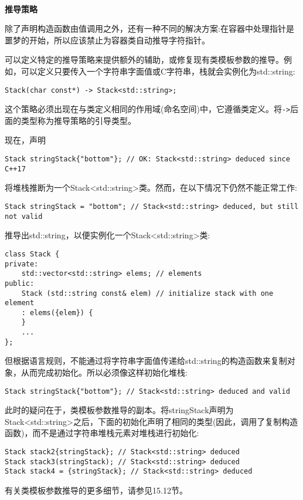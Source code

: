 \hspace*{\fill} \\ %
\noindent
\textbf{推导策略}

除了声明构造函数由值调用之外，还有一种不同的解决方案:在容器中处理指针是噩梦的开始，所以应该禁止为容器类自动推导字符指针。

可以定义特定的推导策略来提供额外的辅助，或修复现有类模板参数的推导。例如，可以定义只要传入一个字符串字面值或C字符串，栈就会实例化为std::string:

\begin{lstlisting}[style=styleCXX]
Stack(char const*) -> Stack<std::string>;
\end{lstlisting}

这个策略必须出现在与类定义相同的作用域(命名空间)中，它遵循类定义。将\texttt{->}后面的类型称为推导策略的引导类型。

现在，声明

\begin{lstlisting}[style=styleCXX]
Stack stringStack{"bottom"}; // OK: Stack<std::string> deduced since C++17
\end{lstlisting}

将堆栈推断为一个Stack<std::string>类。然而，在以下情况下仍然不能正常工作:

\begin{lstlisting}[style=styleCXX]
Stack stringStack = "bottom"; // Stack<std::string> deduced, but still not valid
\end{lstlisting}

推导出std::string，以便实例化一个Stack<std::string>类:

\begin{lstlisting}[style=styleCXX]
class Stack {
private:
	std::vector<std::string> elems; // elements
public:
	Stack (std::string const& elem) // initialize stack with one element
	: elems({elem}) {
	}
	...
};
\end{lstlisting}

但根据语言规则，不能通过将字符串字面值传递给std::string的构造函数来复制对象，从而完成初始化。所以必须像这样初始化堆栈:

\begin{lstlisting}[style=styleCXX]
Stack stringStack{"bottom"}; // Stack<std::string> deduced and valid
\end{lstlisting}

此时的疑问在于，类模板参数推导的副本。将stringStack声明为Stack<std::string>之后，下面的初始化声明了相同的类型(因此，调用了复制构造函数)，而不是通过字符串堆栈元素对堆栈进行初始化:

\begin{lstlisting}[style=styleCXX]
Stack stack2{stringStack}; // Stack<std::string> deduced
Stack stack3(stringStack); // Stack<std::string> deduced
Stack stack4 = {stringStack}; // Stack<std::string> deduced
\end{lstlisting}

有关类模板参数推导的更多细节，请参见15.12节。





















